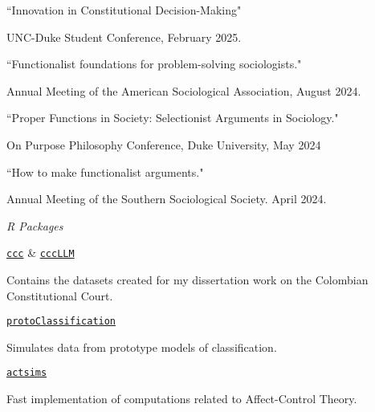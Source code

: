 \documentclass[11pt,article,oneside]{memoir}
\begin{document}
\ind ``Innovation in Constitutional Decision-Making"

\ind \hspace{0.35in} \footnotesize \textemdash UNC-Duke Student Conference, February 2025. \normalsize

\ind ``Functionalist foundations for problem-solving sociologists."

\ind \hspace{0.35in} \footnotesize \textemdash Annual Meeting of the American Sociological Association, August 2024. \normalsize

\ind ``Proper Functions in Society: Selectionist Arguments in Sociology." 

\ind \hspace{0.35in} \footnotesize \textemdash On Purpose Philosophy Conference, Duke University, May 2024 \normalsize

\ind ``How to make functionalist arguments." 

\ind \hspace{0.35in} \footnotesize \textemdash Annual Meeting of the Southern Sociological Society. April 2024. \normalsize

\bigskip 


\medskip
\noindent\emph{R Packages \vspace{0.05in}}

\ind \href{https://acastroaraujo.github.io/ccc/}{\texttt{ccc}} \& \href{https://acastroaraujo.github.io/cccLLM/}{\texttt{cccLLM}} 

\ind \hspace{0.35in} \footnotesize \textemdash Contains the datasets created for my dissertation work on the Colombian Constitutional Court. \normalsize

\ind \href{https://acastroaraujo.github.io/protoClassification/}{\texttt{protoClassification}} 

\ind \hspace{0.35in} \footnotesize \textemdash Simulates data from prototype models of classification. \normalsize

\ind \href{https://acastroaraujo.github.io/actsims/}{\texttt{actsims}} 

\ind \hspace{0.35in} \footnotesize \textemdash Fast implementation of computations related to Affect-Control Theory. \normalsize
\end{document}
